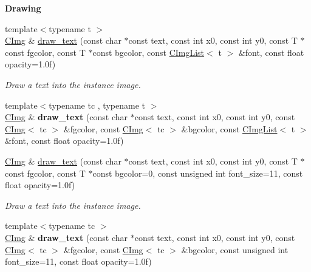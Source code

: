 \begin{Indent}{\bf Drawing}
\begin{DoxyCompactItemize}
\item 
{\footnotesize template$<$typename t $>$ }\\\hyperlink{structcimg__library_1_1_c_img}{C\-Img} \& \hyperlink{structcimg__library_1_1_c_img_ac2e3a649006d1984a2559c30cd742080}{draw\-\_\-text} (const char $\ast$const text, const int x0, const int y0, const T $\ast$const fgcolor, const T $\ast$const bgcolor, const \hyperlink{structcimg__library_1_1_c_img_list}{C\-Img\-List}$<$ t $>$ \&font, const float opacity=1.\-0f)
\begin{DoxyCompactList}\small\item\em Draw a text into the instance image. \end{DoxyCompactList}\item 
\hypertarget{structcimg__library_1_1_c_img_a293b76147b7c5f5a9806b5f63d60148b}{{\footnotesize template$<$typename tc , typename t $>$ }\\\hyperlink{structcimg__library_1_1_c_img}{C\-Img} \& {\bfseries draw\-\_\-text} (const char $\ast$const text, const int x0, const int y0, const \hyperlink{structcimg__library_1_1_c_img}{C\-Img}$<$ tc $>$ \&fgcolor, const \hyperlink{structcimg__library_1_1_c_img}{C\-Img}$<$ tc $>$ \&bgcolor, const \hyperlink{structcimg__library_1_1_c_img_list}{C\-Img\-List}$<$ t $>$ \&font, const float opacity=1.\-0f)}\label{structcimg__library_1_1_c_img_a293b76147b7c5f5a9806b5f63d60148b}

\item 
\hyperlink{structcimg__library_1_1_c_img}{C\-Img} \& \hyperlink{structcimg__library_1_1_c_img_ac12c8f45e022ad0fa3bed46aee54ee48}{draw\-\_\-text} (const char $\ast$const text, const int x0, const int y0, const T $\ast$const fgcolor, const T $\ast$const bgcolor=0, const unsigned int font\-\_\-size=11, const float opacity=1.\-0f)
\begin{DoxyCompactList}\small\item\em Draw a text into the instance image. \end{DoxyCompactList}\item 
\hypertarget{structcimg__library_1_1_c_img_ac25a2dbff9c367ed71acb27909ebf7e5}{{\footnotesize template$<$typename tc $>$ }\\\hyperlink{structcimg__library_1_1_c_img}{C\-Img} \& {\bfseries draw\-\_\-text} (const char $\ast$const text, const int x0, const int y0, const \hyperlink{structcimg__library_1_1_c_img}{C\-Img}$<$ tc $>$ \&fgcolor, const \hyperlink{structcimg__library_1_1_c_img}{C\-Img}$<$ tc $>$ \&bgcolor, const unsigned int font\-\_\-size=11, const float opacity=1.\-0f)}\label{structcimg__library_1_1_c_img_ac25a2dbff9c367ed71acb27909ebf7e5}


\end{DoxyCompactItemize}
\end{Indent}
